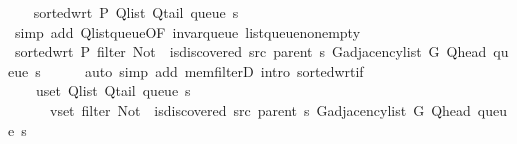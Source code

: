 \begin{isabellebody}
\ \ \isamarkupfalse%
\ {\isachardoublequoteopen}sorted{\isacharunderscore}{\kern0pt}wrt\ {\isacharquery}{\kern0pt}P\ {\isacharparenleft}{\kern0pt}Q{\isacharunderscore}{\kern0pt}list\ {\isacharparenleft}{\kern0pt}Q{\isacharunderscore}{\kern0pt}tail\ {\isacharparenleft}{\kern0pt}queue\ s{\isacharparenright}{\kern0pt}{\isacharparenright}{\kern0pt}{\isacharparenright}{\kern0pt}{\isachardoublequoteclose}\isanewline
\ \ \ \ \isamarkupfalse%
\ {\isacharparenleft}{\kern0pt}simp\ add{\isacharcolon}{\kern0pt}\ Q{\isachardot}{\kern0pt}list{\isacharunderscore}{\kern0pt}queue{\isacharbrackleft}{\kern0pt}OF\ invar{\isacharunderscore}{\kern0pt}queue\ list{\isacharunderscore}{\kern0pt}queue{\isacharunderscore}{\kern0pt}non{\isacharunderscore}{\kern0pt}empty{\isacharbrackright}{\kern0pt}{\isacharparenright}{\kern0pt}\isanewline
\ \ \isamarkupfalse%
\ \isamarkupfalse%
\ {\isachardoublequoteopen}sorted{\isacharunderscore}{\kern0pt}wrt\ {\isacharquery}{\kern0pt}P\ {\isacharparenleft}{\kern0pt}filter\ {\isacharparenleft}{\kern0pt}Not\ {\isasymcirc}\ is{\isacharunderscore}{\kern0pt}discovered\ src\ {\isacharparenleft}{\kern0pt}parent\ s{\isacharparenright}{\kern0pt}{\isacharparenright}{\kern0pt}\ {\isacharparenleft}{\kern0pt}G{\isachardot}{\kern0pt}adjacency{\isacharunderscore}{\kern0pt}list\ G\ {\isacharparenleft}{\kern0pt}Q{\isacharunderscore}{\kern0pt}head\ {\isacharparenleft}{\kern0pt}queue\ s{\isacharparenright}{\kern0pt}{\isacharparenright}{\kern0pt}{\isacharparenright}{\kern0pt}{\isacharparenright}{\kern0pt}{\isachardoublequoteclose}\isanewline
\ \ \ \ \isamarkupfalse%
\ {\isacharparenleft}{\kern0pt}auto\ simp\ add{\isacharcolon}{\kern0pt}\ mem{\isacharunderscore}{\kern0pt}filterD{\isacharparenleft}{\kern0pt}{}{\isacharparenright}{\kern0pt}\ intro{\isacharcolon}{\kern0pt}\ sorted{\isacharunderscore}{\kern0pt}wrt{\isacharunderscore}{\kern0pt}if{\isacharparenright}{\kern0pt}\isanewline
\ \ \isamarkupfalse%
\ \isamarkupfalse%
\isanewline
\ \ \ \ {\isachardoublequoteopen}{\isasymforall}u{\isasymin}set\ {\isacharparenleft}{\kern0pt}Q{\isacharunderscore}{\kern0pt}list\ {\isacharparenleft}{\kern0pt}Q{\isacharunderscore}{\kern0pt}tail\ {\isacharparenleft}{\kern0pt}queue\ s{\isacharparenright}{\kern0pt}{\isacharparenright}{\kern0pt}{\isacharparenright}{\kern0pt}{\isachardot}{\kern0pt}\isanewline
\ \ \ \ \ \ {\isasymforall}v{\isasymin}set\ {\isacharparenleft}{\kern0pt}filter\ {\isacharparenleft}{\kern0pt}Not\ {\isasymcirc}\ is{\isacharunderscore}{\kern0pt}discovered\ src\ {\isacharparenleft}{\kern0pt}parent\ s{\isacharparenright}{\kern0pt}{\isacharparenright}{\kern0pt}\ {\isacharparenleft}{\kern0pt}G{\isachardot}{\kern0pt}adjacency{\isacharunderscore}{\kern0pt}list\ G\ {\isacharparenleft}{\kern0pt}Q{\isacharunderscore}{\kern0pt}head\ {\isacharparenleft}{\kern0pt}queue\ s{\isacharparenright}{\kern0pt}{\isacharparenright}{\kern0pt}{\isacharparenright}{\kern0pt}{\isacharparenright}{\kern0pt}{\isachardot}{\kern0pt}\isanewline

\end{isabellebody}
